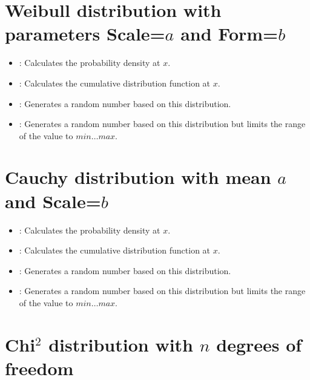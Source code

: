 \section{Weibull distribution with parameters Scale=\texorpdfstring{$a$}{a} and Form=\texorpdfstring{$b$}{b}}

\begin{itemize}

\item
{}:
Calculates the probability density at $x$.

\item
{}:
Calculates the cumulative distribution function at $x$.

\item
{}:
Generates a random number based on this distribution.

\item
{}:
Generates a random number based on this distribution but limits the range of the value to $min\ldots max$.

\end{itemize}



\section{Cauchy distribution with mean \texorpdfstring{$a$}{a} and Scale=\texorpdfstring{$b$}{b}}

\begin{itemize}

\item
{}:
Calculates the probability density at $x$.

\item
{}:
Calculates the cumulative distribution function at $x$.

\item
{}:
Generates a random number based on this distribution.

\item
{}:
Generates a random number based on this distribution but limits the range of the value to $min\ldots max$.

\end{itemize}



\section{\texorpdfstring{Chi$^2$}{Chi2} distribution with \texorpdfstring{$n$}{n} degrees of freedom}

